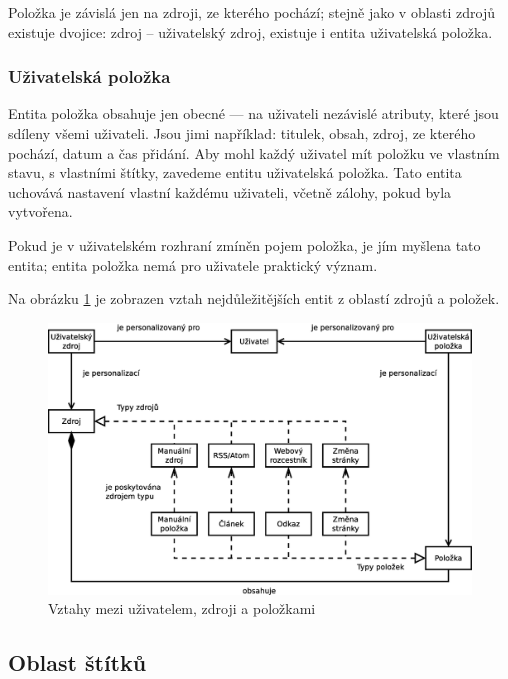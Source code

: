 \bigskip{}

Položka je závislá jen na zdroji, ze kterého pochází; stejně jako v oblasti zdrojů existuje dvojice: zdroj -- uživatelský zdroj, existuje i entita uživatelská položka.

\subsubsection{Uživatelská položka}

Entita položka obsahuje jen obecné --- na uživateli nezávislé atributy, které jsou sdíleny všemi uživateli.
Jsou jimi například: titulek, obsah, zdroj, ze kterého pochází, datum a čas přidání.
Aby mohl každý uživatel mít položku ve vlastním stavu, s vlastními štítky, zavedeme entitu uživatelská položka.
Tato entita uchovává nastavení vlastní každému uživateli, včetně zálohy, pokud byla vytvořena.

Pokud je v uživatelském rozhraní zmíněn pojem položka, je jím myšlena tato entita; entita položka nemá pro uživatele praktický význam.

\bigskip{}

Na obrázku \ref{fig:source-item} je zobrazen vztah nejdůležitějších entit z oblastí zdrojů a položek.

\begin{figure}
    \centering
    \includegraphics[width=12cm]{img/zdroje-polozky.eps}
    \caption{Vztahy mezi uživatelem, zdroji a položkami}
    \label{fig:source-item}
\end{figure}

\subsection{Oblast štítků}


